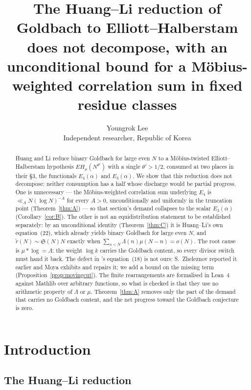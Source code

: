 \documentclass[11pt,a4paper]{article}
\title{The Huang--Li reduction of Goldbach to Elliott--Halberstam does
not decompose, with an unconditional bound for a M\"obius-weighted
correlation sum in fixed residue classes}
\author{Youngrok Lee\\
\small Independent researcher, Republic of Korea}
\date{}
\theoremstyle{plain}
\theoremstyle{definition}
\theoremstyle{remark}
\renewcommand{\SS}{\mathfrak{S}}
\begin{document}
\maketitle

\begin{abstract}
Huang and Li \cite{HL} reduce binary Goldbach for large even $N$ to a
M\"obius-twisted Elliott--Halberstam hypothesis $EH_\mu(N^{\theta'})$
with a single $\theta'>1/2$, consumed at two places in their \S3, the
functionals $E_4(\alpha)$ and $E_3(\alpha)$. We show that this
reduction does not decompose: neither consumption has a half whose
discharge would be partial progress. One is unnecessary --- the
M\"obius-weighted correlation sum underlying $E_4$ is
$\ll_A N(\log N)^{-A}$ for every $A>0$, unconditionally and uniformly
in the truncation point (Theorem~\ref{thm:A}) --- so that section's
demand collapses to the scalar $E_3(\alpha)$ (Corollary~\ref{cor:B}).
The other is not an equidistribution statement to be established
separately: by an unconditional identity (Theorem~\ref{thm:C}) it is
Huang--Li's own equation~(22), which already yields binary Goldbach for
large even $N$, and $\tilde r(N)\sim\SS(N)N$ exactly when
$\sum_{n<N}\Lambda(n)\mu(N-n)=o(N)$. The root cause is
$\mu*\log=\Lambda$: the weight $\log k$ carries the Goldbach content,
so every divisor switch must hand it back. The defect in \cite{HL}'s
equation~(18) is not ours: S.~Zheleznov reported it earlier and Moya
\cite{Moya} exhibits and repairs it; we add a bound on the missing term
(Proposition~\ref{prop:movingcut}). The finite rearrangements are
formalised in Lean~4 against Mathlib over arbitrary functions, so what
is checked is that they use no arithmetic property of $\Lambda$ or
$\mu$. Theorem~\ref{thm:A} removes only the part of the demand that
carries no Goldbach content, and the net progress toward the Goldbach
conjecture is zero.
\end{abstract}

\section{Introduction}

\subsection{The Huang--Li reduction}
\end{document}
